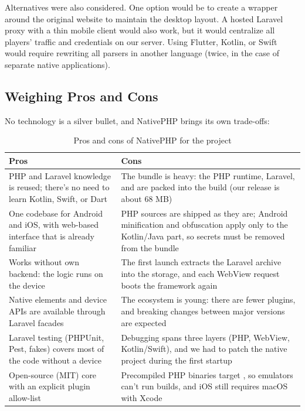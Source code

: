 \noindent Alternatives were also considered. One option would be to create a wrapper around the
original website to maintain the desktop layout. A hosted Laravel proxy with a thin mobile
client would also work, but it would centralize all players' traffic and credentials on our
server. Using Flutter, Kotlin, or Swift would require rewriting all parsers in another language
(twice, in the case of separate native applications).


\newpage
\subsection{Weighing Pros and Cons}

No technology is a silver bullet, and NativePHP brings its own trade-offs:

\begin{table}[!ht]
  \centering
  \footnotesize
  \begin{tabularx}{\textwidth}{|X|X|}
    \hline
    \textbf{Pros} & \textbf{Cons} \\
    \hline
    PHP and Laravel knowledge is reused; there's no need to learn Kotlin, Swift, or Dart &
    The bundle is heavy: the PHP runtime, Laravel, and \q{vendor} are packed into the build
    (our release \q{.aab} is about 68 MB) \\
    \hline
    One codebase for Android and iOS, with web-based interface that is already familiar &
    PHP sources are shipped as they are; Android minification and obfuscation apply only to the
    Kotlin/Java part, so secrets must be removed from the bundle \\
    \hline
    Works without own backend: the logic runs on the device &
    The first launch extracts the Laravel archive into the storage, and each WebView request
    boots the framework again \\
    \hline
    Native elements and device APIs are available through Laravel facades &
    The ecosystem is young: there are fewer plugins, and breaking changes between major
    versions are expected \\
    \hline
    Laravel testing (PHPUnit, Pest, fakes) covers most of the code without a device &
    Debugging spans three layers (PHP, WebView, Kotlin/Swift), and we had to patch the native
    project during the first startup \\
    \hline
    Open-source (MIT) core with an explicit plugin allow-list &
    Precompiled PHP binaries target \q{arm64-v8a}, so \q{x86\_64} emulators can't run builds,
    and iOS still requires macOS with Xcode \\
    \hline
  \end{tabularx}
  \caption{Pros and cons of NativePHP for the project}
  \label{tbl:concept-pros-cons}
\end{table}

